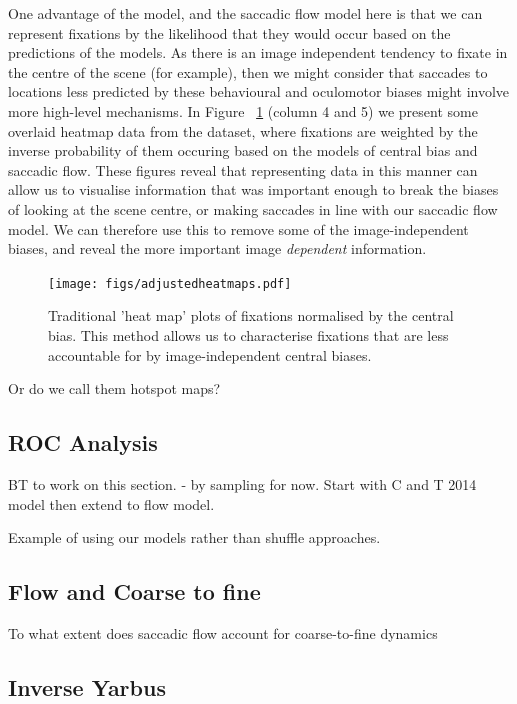 \documentclass[a4paper, onecolumn, oneside, 11pt]{article}
\begin{document}
One advantage of the \citep{clarke-tatler2014} model, and the saccadic flow model here is that we can represent fixations by the likelihood that they would occur based on the predictions of the models. As there is an image independent tendency to fixate in the centre of the scene (for example), then we might consider that saccades to locations less predicted by these behavioural and oculomotor biases might involve more high-level mechanisms. In Figure ~\ref{fig:adjustedHeatmaps} (column 4 and 5) we present some overlaid heatmap data from the \citep{clarke2013} dataset, where fixations are weighted by the inverse probability of them occuring based on the models of central bias and saccadic flow. These figures reveal that representing data in this manner can allow us to visualise information that was important enough to break the biases of looking at the scene centre, or making saccades in line with our saccadic flow model. We can therefore use this to remove some of the image-independent biases, and reveal the more important image \emph{dependent} information.

\begin{figure}
\texttt{[image: figs/adjustedheatmaps.pdf]}
\caption{Traditional 'heat map' plots of fixations normalised by the central bias. This method allows us to characterise fixations that are less accountable for by image-independent central biases.}
\label{fig:adjustedHeatmaps}
\end{figure}

Or do we call them hotspot maps?

\subsection{ROC Analysis}

BT to work on this section.
 - by sampling for now. Start with C and T 2014 model then extend to flow model.

Example of using our models rather than shuffle approaches.

\subsection{Flow and Coarse to fine}
To what extent does saccadic flow account for coarse-to-fine dynamics

\subsection{Inverse Yarbus}
\end{document}
